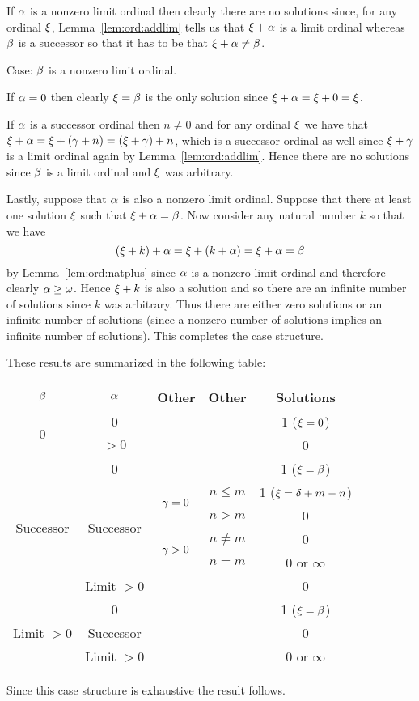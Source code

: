 {{    If $\alpha$ is a nonzero limit ordinal then clearly there are no solutions since, for any ordinal $\xi$, Lemma~\ref{lem:ord:addlim} tells us that $\xi + \alpha$ is a limit ordinal whereas $\beta$ is a successor so that it has to be that $\xi + \alpha \neq \beta$.

    Case: $\beta$ is a nonzero limit ordinal.

    If $\alpha = 0$ then clearly $\xi = \beta$ is the only solution since $\xi + \alpha = \xi + 0 = \xi$.

    If $\alpha$ is a successor ordinal then $n \neq 0$ and for any ordinal $\xi$ we have that $\xi + \alpha = \xi + (\gamma + n) = (\xi + \gamma) + n$, which is a successor ordinal as well since $\xi + \gamma$ is a limit ordinal again by Lemma~\ref{lem:ord:addlim}.
    Hence there are no solutions since $\beta$ is a limit ordinal and $\xi$ was arbitrary.

    Lastly, suppose that $\alpha$ is also a nonzero limit ordinal.
    Suppose that there at least one solution $\xi$ such that $\xi + \alpha = \beta$.
    Now consider any natural number $k$ so that we have
    $$
    (\xi + k) + \alpha = \xi + (k + \alpha) = \xi + \alpha = \beta
    $$
    by Lemma~\ref{lem:ord:natplus} since $\alpha$ is a nonzero limit ordinal and therefore clearly $\alpha \geq \omega$.
    Hence $\xi + k$ is also a solution and so there are an infinite number of solutions since $k$ was arbitrary.
    Thus there are either zero solutions or an infinite number of solutions (since a nonzero number of solutions implies an infinite number of solutions).
    This completes the case structure.

    These results are summarized in the following table:
    \begin{center}
      \begin{tabular}{|c|c|c|c|c|}
        \hline
        $\beta$ & $\alpha$ & Other & Other & Solutions \\
        \hline
        \multirow{2}{*}{0} & 0 & & & 1 ($\xi = 0$) \\
        \cline{2-5}
        & $>0$ & & &  0 \\
        \hline
        \multirow{6}{*}{Successor} & 0 & & & 1 ($\xi = \beta$) \\
        \cline{2-5}
        & \multirow{4}{*}{Successor} & \multirow{2}{*}{$\gamma = 0$} & $n \leq m$ & 1 ($\xi = \delta + m - n$) \\
        \cline{4-5}
        & & & $n > m$ & 0 \\
        \cline{3-5}        
        & & \multirow{2}{*}{$\gamma > 0$} & $n \neq m$ & 0 \\
        \cline{4-5}
        & & & $n = m$ & 0 or $\infty$ \\
        \cline{2-5}
        & Limit $>0$ & & & 0 \\
        \hline
        \multirow{3}{*}{Limit $>0$} & 0 & & & 1 ($\xi =\beta$) \\
        \cline{2-5}
        & Successor & & & 0 \\
        \cline{2-5}
        & Limit $>0$ & & & 0 or $\infty$ \\
        \hline
      \end{tabular}
    \end{center}

    Since this case structure is exhaustive the result follows.
  }
}

